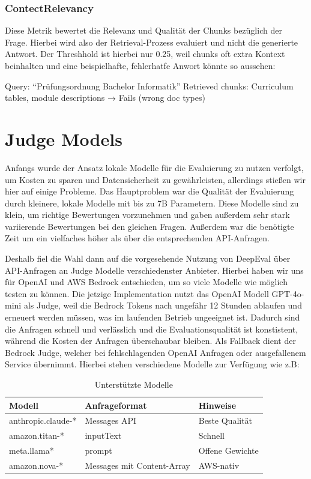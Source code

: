 \subsubsection{ContectRelevancy}
Diese Metrik bewertet die Relevanz und Qualität der Chunks bezüglich der Frage. Hierbei wird also der Retrieval-Prozess evaluiert und nicht die generierte Antwort. Der Threshhold ist hierbei nur  0.25, weil chunks oft extra Kontext beinhalten und eine beispielhafte, fehlerhatfe Anwort könnte so aussehen:

Query: \enquote{Prüfungsordnung Bachelor Informatik}\newline
Retrieved chunks: Curriculum tables, module descriptions → Fails (wrong doc types)

\section{Judge Models}
Anfangs wurde der Ansatz lokale Modelle für die Evaluierung zu nutzen verfolgt, um Kosten zu sparen und Datensicherheit zu gewährleisten, allerdings stießen wir hier auf einige Probleme. Das Hauptproblem war die Qualität der Evaluierung durch kleinere, lokale Modelle mit bis zu 7B Parametern. Diese Modelle sind zu klein, um richtige Bewertungen  vorzunehmen und gaben außerdem sehr stark variierende Bewertungen bei den gleichen Fragen. Außerdem war die benötigte Zeit um ein vielfaches höher als über die entsprechenden API-Anfragen.

Deshalb fiel die Wahl dann auf die vorgesehende Nutzung von DeepEval über API-Anfragen an Judge Modelle verschiedenster Anbieter. Hierbei haben wir uns für OpenAI und AWS Bedrock entschieden, um so viele Modelle wie möglich testen zu können. Die jetzige Implementation nutzt  das OpenAI Modell GPT-4o-mini als Judge, weil die Bedrock Tokens nach ungefähr 12 Stunden ablaufen und erneuert werden müssen, was im laufenden Betrieb ungeeignet ist. Dadurch sind die Anfragen schnell und verlässlich und die Evaluationsqualität ist konstistent, während die Kosten der Anfragen überschaubar bleiben. Als Fallback dient der Bedrock Judge, welcher bei fehlschlagenden OpenAI Anfragen oder ausgefallenem Service übernimmt. Hierbei stehen verschiedene Modelle zur Verfügung wie z.B:

\begin{table}[htbp]
\centering
\begin{tabular}{|l|l|l|}
\hline
\textbf{Modell} & \textbf{Anfrageformat} & \textbf{Hinweise} \\
\hline
anthropic.claude-* & Messages API & Beste Qualität \\
amazon.titan-* & inputText & Schnell \\
meta.llama* & prompt & Offene Gewichte \\
amazon.nova-* & Messages mit Content-Array & AWS-nativ \\
\hline
\end{tabular}
\caption{Unterstützte Modelle}
\end{table}


